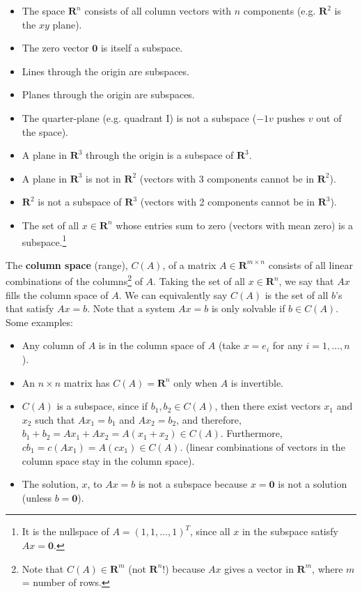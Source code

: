 \documentclass[11pt]{article}
\theoremstyle{plain}
\theoremstyle{definition}
\theoremstyle{remark}
\numberwithin{equation}{section}
\begin{document}
\begin{itemize}[noitemsep]
\item The space $\mathbf{R}^n$ consists of all column vectors with $n$ components (e.g. $\mathbf{R}^2$ is the $xy$ plane). 
\item The zero vector $\mathbf{0}$ is itself a subspace.
\item Lines through the origin are subspaces.
\item Planes through the origin are subspaces.
\item The quarter-plane (e.g. quadrant I) is not a subspace ($-1 v$ pushes $v$ out of the space).
\item A plane in $\mathbf{R}^3$ through the origin is a subspace of $\mathbf{R}^3$.
\item A plane in $\mathbf{R}^3$ is not in $\mathbf{R}^2$ (vectors with 3 components cannot be in $\mathbf{R}^2$).
\item $\mathbf{R}^2$ is not a subspace of $\mathbf{R}^3$ (vectors with 2 components cannot be in $\mathbf{R}^3$).
\item The set of all $x \in \mathbf{R}^n$ whose entries sum to zero (vectors with mean zero) is a subspace.\footnote{It is the nullspace of $A = (1, 1, \dots, 1)^T$, since all $x$ in the subspace satisfy $A x = \mathbf{0}$.}
\end{itemize}


The {\bf column space} (range), $C(A)$, of a matrix $A \in \mathbf{R}^{m \times n}$ consists of all linear combinations of the columns\footnote{Note that $C(A) \in \mathbf{R}^m$ (not $\mathbf{R}^n$!) because $A x$ gives a vector in $\mathbf{R}^m$, where $m$ = number of rows.} of $A$. Taking the set of all $x \in \mathbf{R}^n$, we say that $A x$ fills the column space of $A$. We can equivalently say $C(A)$ is the set of all $b$'s that satisfy $A x = b$. Note that a system $A x = b$ is only solvable if $b \in C(A)$. Some examples:
 
\begin{itemize}[noitemsep]%
\item Any column of $A$ is in the column space of $A$ (take $x = e_i$ for any $i = 1, \dots, n$).
\item An $n \times n$ matrix has $C(A) = \mathbf{R}^n$ only when $A$ is invertible.
\item $C(A)$ is a subspace, since if $b_1, b_2 \in C(A)$, then there exist vectors $x_1$ and $x_2$ such that $A x_1 = b_1$ and $A x_2 = b_2$, and therefore, $b_1 + b_2 = A x_1 + A x_2 = A (x_1 + x_2) \in C(A)$. Furthermore, $c b_1 = c (A x_1) = A (c x_1) \in C(A)$. (linear combinations of vectors in the column space stay in the column space).
\item The solution, $x$, to $A x = b$ is not a subspace because $x = \mathbf{0}$ is not a solution (unless $b = \mathbf{0}$).
\end{itemize}
\end{document}
